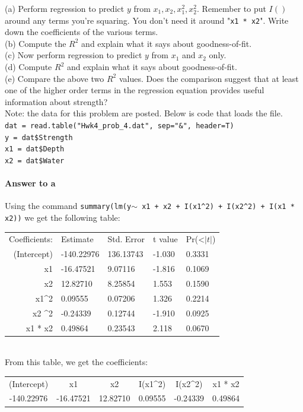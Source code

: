 \documentclass{article}
\newcommand{\code}[1]{\texttt{#1}} %
\newcommand{\p}[1]{\paragraph{#1}} %
\newcommand{\addsubsection}[1]{\addcontentsline{toc}{subsection}{#1}} %
\begin{document}
	(a) Perform regression to predict $y$ from $x_1, x_2, x_1^2, x_2^2$. Remember to put $I()$ 
	around any terms you're squaring. You don't need it around "\code{x1 * x2}". Write down the 
	coefficients of the various terms. \\
	(b) Compute the $R^2$ and explain what it says about goodness-of-fit. \\
	(c) Now perform regression to predict $y$ from $x_1$ and $x_2$ only. \\
	(d) Compute $R^2$ and explain what it says about goodness-of-fit. \\
	(e) Compare the above two $R^2$ values. Does the comparison suggest that at least one of the 
	higher order terms in the regression equation provides useful information about strength? \\
	
	Note: the data for this problem are posted. Below is code that loads the file.\\

	\code{dat = read.table("Hwk4\_prob\_4.dat", sep="\&", header=T)} \\
	\code{y = dat\$Strength} \\
	\code{x1 = dat\$Depth} \\
	\code{x2 = dat\$Water}
	
	\addsubsection{Answer to 4.a}
	\p{Answer to a}
	Using the command \code{summary(lm(y$\sim$ x1 + x2 + I(x1\textasciicircum 2) + 
	I(x2\textasciicircum 2) + I(x1 * x2))} we get the following table: \\
	\begin{tabular}{ r l l l l }
		Coefficients: & Estimate & Std. Error & t value & Pr(\textless$|t|$) \\
		(Intercept) & -140.22976 & 136.13743 & -1.030 & 0.3331 \\
		x1 & -16.47521 & 9.07116 & -1.816 & 0.1069 \\
		x2 & 12.82710 & 8.25854 & 1.553 & 0.1590 \\
		x1\textasciicircum 2 & 0.09555 & 0.07206 & 1.326 & 0.2214 \\
		x2 \textasciicircum 2 & -0.24339 & 0.12744 & -1.910 & 0.0925 \\
		x1 * x2 & 0.49864 & 0.23543 & 2.118 & 0.0670
	\end{tabular} \\
	
	From this table, we get the coefficients:
	\begin{tabular}{ c c c c c c }
		(Intercept) & x1 & x2 & I(x1\textasciicircum 2) & I(x2\textasciicircum 2) & x1 * x2 \\
		-140.22976 & -16.47521 & 12.82710 & 0.09555 & -0.24339 & 0.49864
	\end{tabular} \\
	
\end{document}
